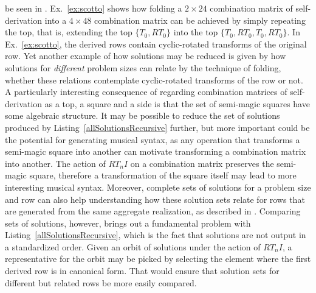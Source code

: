be seen in \cite{Scotto2000}. Ex.~\ref{ex:scotto} shows how folding a $2 \times 24$ combination matrix of self-derivation into a $4 \times 48$ combination matrix can be achieved by simply repeating the top, that is, extending the top $\{T_0, RT_0\}$ into the top $\{T_0, RT_0, T_0, RT_0\}$. In Ex.~\ref{ex:scotto}, the derived rows contain cyclic-rotated transforms of the original row. Yet another example of how solutions may be reduced is given by how solutions for \emph{different} problem sizes can relate by the technique of folding, whether these relations contemplate cyclic-rotated transforms of the row or not. A particularly interesting consequence of regarding combination matrices of self-derivation as a top, a square and a side is that the set of semi-magic squares have some algebraic structure. It may be possible to reduce the set of solutions produced by Listing~\ref{allSolutionsRecursive} further, but more important could be the potential for generating musical syntax, as any operation that transforms a semi-magic square into another can motivate transforming a combination matrix into another. The action of $RT_nI$ on a combination matrix preserves the semi-magic square, therefore a transformation of the square itself may lead to more interesting musical syntax. Moreover, complete sets of solutions for a problem size and row can also help understanding how these solution sets relate for rows that are generated from the same aggregate realization, as described in \cite{Starr1984}. Comparing sets of solutions, however, brings out a fundamental problem with Listing~\ref{allSolutionsRecursive}, which is the fact that solutions are not output in a standardized order. Given an orbit of solutions under the action of $RT_nI$, a representative for the orbit may be picked by selecting the element where the first derived row is in canonical form. That would ensure that solution sets for different but related rows be more easily compared.

